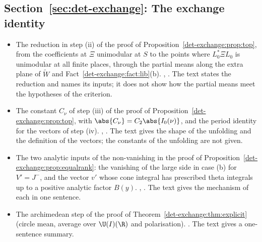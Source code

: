 \subsection*{Section~\ref{sec:det-exchange}: The exchange identity}
\begin{itemize}[leftmargin=2em,itemsep=1pt]
\item The reduction in step (ii) of the proof of Proposition~\ref{det-exchange:prop:top}, from the
  coefficients at $\Xi$ unimodular at $S$ to the points where $L_0^*\Xi L_0$ is unimodular at all
  finite places, through the partial means along the extra plane of $\widetilde W$ and
  Fact~\ref{det-exchange:fact:lib}(b).
  ,
  . The text states the reduction
  and names its inputs; it does not show how the partial means meet the hypotheses of the criterion.
\item The constant $C_\nu$ of step (iii) of the proof of Proposition~\ref{det-exchange:prop:top},
  with $\abs{C_\nu}=C_2\abs{I_0(\nu)}$, and the period identity for the vectors of step (iv).
  ,
  . The text gives the shape of the unfolding and
  the definition of the vectors; the constants of the unfolding are not given.
\item The two analytic inputs of the non-vanishing in the proof of
  Proposition~\ref{det-exchange:prop:equalrank}: the vanishing of the large side in case (b) for
  $V'=J^-$, and the vector $v'$ whose cone integral has prescribed theta integrals up to a positive
  analytic factor $B(y)$. ,
  . The text gives the mechanism of each in one
  sentence.
\item The archimedean step of the proof of Theorem~\ref{det-exchange:thm:explicit} (circle mean,
  average over $\U(I)(\R)$ and polarisation). .
  The text gives a one-sentence summary.
\end{itemize}

